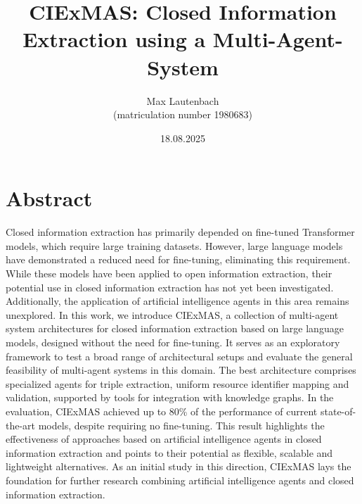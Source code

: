 \documentclass[a4paper,oneside,bibliography=totoc]{scrbook}
\begin{document}
\frontmatter
\subject{Master Thesis}
\title{CIExMAS: Closed Information Extraction using a Multi-Agent-System}
\author{Max Lautenbach\\
  (matriculation number 1980683)}
\date{18.08.2025}
\publishers{{\small Submitted to}\\
  Data and Web Science Group\\
  Dr.\ Sven Hertling\\
  University of Mannheim\\}
\maketitle

\chapter{Abstract}
Closed information extraction has primarily depended on fine-tuned Transformer models, which require large training datasets. However, large language models have demonstrated a reduced need for fine-tuning, eliminating this requirement. While these models have been applied to open information extraction, their potential use in closed information extraction has not yet been investigated. Additionally, the application of artificial intelligence agents in this area remains unexplored. In this work, we introduce CIExMAS, a collection of multi-agent system architectures for closed information extraction based on large language models, designed without the need for fine-tuning. It serves as an exploratory framework to test a broad range of architectural setups and evaluate the general feasibility of multi-agent systems in this domain. The best architecture comprises specialized agents for triple extraction, uniform resource identifier mapping and validation, supported by tools for integration with knowledge graphs. In the evaluation, CIExMAS achieved up to 80\% of the performance of current state-of-the-art models, despite requiring no fine-tuning. This result highlights the effectiveness of approaches based on artificial intelligence agents in closed information extraction and points to their potential as flexible, scalable and lightweight alternatives. As an initial study in this direction, CIExMAS lays the foundation for further research combining artificial intelligence agents and closed information extraction.

\begingroup%
\hypersetup{hidelinks}%
\tableofcontents%
\endgroup

\begingroup%
\hypersetup{hidelinks}%
\listoffigures%
\endgroup
\end{document}
